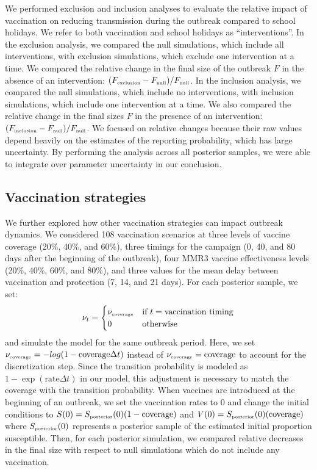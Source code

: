 \documentclass[12pt]{article}
\newcommand{\tsub}[2]{#1_{{\textrm{\tiny #2}}}}
\begin{document}
We performed exclusion and inclusion analyses to evaluate the relative impact of vaccination on reducing transmission during the outbreak compared to school holidays.
We refer to both vaccination and school holidays as ``interventions''.
In the exclusion analysis, we compared the null simulations, which include all interventions, with exclusion simulations, which exclude one intervention at a time.
We compared the relative change in the final size of the outbreak $F$ in the absence of an intervention: $(\tsub{F}{exclusion}-\tsub{F}{null})/\tsub{F}{null}$.
In the inclusion analysis, we compared the null simulations, which include no interventions, with inclusion simulations, which include one intervention at a time.
We also compared the relative change in the final sizes $F$ in the presence of an intervention: $(\tsub{F}{inclusion}-\tsub{F}{null})/\tsub{F}{null}$.
We focused on relative changes because their raw values depend heavily on the estimates of the reporting probability, which has large uncertainty.
By performing the analysis across all posterior samples, we were able to integrate over parameter uncertainty in our conclusion.

\subsection{Vaccination strategies}

We further explored how other vaccination strategies can impact outbreak dynamics.
We considered 108 vaccination scenarios at three levels of vaccine coverage (20\%, 40\%, and 60\%), three timings for the campaign (0, 40, and 80 days after the beginning of the outbreak), four MMR3 vaccine effectiveness levels (20\%, 40\%, 60\%, and 80\%), and three values for the mean delay between vaccination and protection (7, 14, and 21 days).
For each posterior sample, we set:
\begin{equation}
\nu_t = \begin{cases}
\tsub{\nu}{coverage} & \textrm{if } t = \textrm{vaccination timing}\\
0 & \textrm{otherwise}
\end{cases}
\end{equation}
and simulate the model for the same outbreak period.
Here, we set $\tsub{\nu}{coverage} = -log(1-\textrm{coverage} \Delta t)$ instead of $\tsub{\nu}{coverage} = \textrm{coverage}$ to account for the discretization step.
Since the transition probability is modeled as $1-\exp(\mathrm{rate} \Delta t)$ in our model, this adjustment is necessary to match the coverage with the transition probability.
When vaccines are introduced at the beginning of an outbreak, we set the vaccination rates to 0 and change the initial conditions to $S(0) = \tsub{S}{posterior}(0) (1 - \textrm{coverage})$ and $V(0) = \tsub{S}{posterior}(0) (\textrm{coverage})$ where $\tsub{S}{posterior}(0)$ represents a posterior sample of the estimated initial proportion susceptible.
Then, for each posterior simulation, we compared relative decreases in the final size with respect to null simulations which do not include any vaccination.
\end{document}
